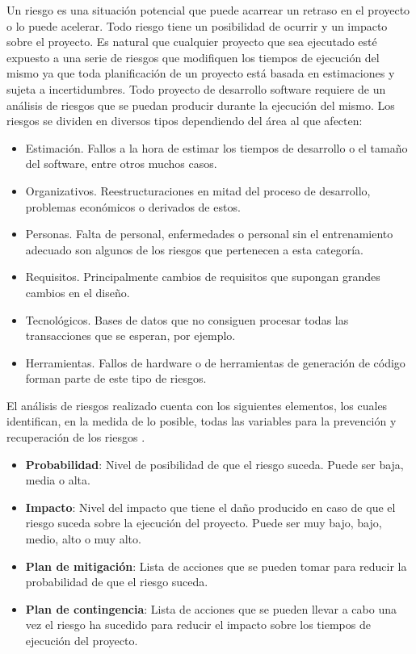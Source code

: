 Un riesgo es una situación potencial que puede acarrear un retraso en el proyecto o lo puede acelerar. Todo riesgo tiene un posibilidad de ocurrir y un impacto sobre el proyecto. Es natural que cualquier proyecto que sea ejecutado esté expuesto a una serie de riesgos que modifiquen los tiempos de ejecución del mismo ya que toda planificación de un proyecto está basada en estimaciones y sujeta a incertidumbres. Todo proyecto de desarrollo software requiere de un análisis de riesgos que se puedan producir durante la ejecución del mismo. Los riesgos se dividen en diversos tipos dependiendo del área al que afecten:

\begin{itemize}
	\item Estimación. Fallos a la hora de estimar los tiempos de desarrollo o el tamaño del software, entre otros muchos casos.
	\item Organizativos. Reestructuraciones en mitad del proceso de desarrollo, problemas económicos o derivados de estos.
	\item Personas. Falta de personal, enfermedades o personal sin el entrenamiento adecuado son algunos de los riesgos que pertenecen a esta categoría.
	\item Requisitos. Principalmente cambios de requisitos que supongan grandes cambios en el diseño.
	\item Tecnológicos. Bases de datos que no consiguen procesar todas las transacciones que se esperan, por ejemplo.
	\item Herramientas. Fallos de hardware o de herramientas de generación de código forman parte de este tipo de riesgos.
\end{itemize}

El análisis de riesgos realizado cuenta con los siguientes elementos, los cuales identifican, en la medida de lo posible, todas las variables para la prevención y recuperación de los riesgos \cite{hughes2009software} \cite{sommerville2016software}.

\begin{itemize}
	\item \textbf{Probabilidad}: Nivel de posibilidad de que el riesgo suceda. Puede ser baja, media o alta.
	\item \textbf{Impacto}: Nivel del impacto que tiene el daño producido en caso de que el riesgo suceda sobre la ejecución del proyecto. Puede ser muy bajo, bajo, medio, alto o muy alto.
	\item \textbf{Plan de mitigación}: Lista de acciones que se pueden tomar para reducir la probabilidad de que el riesgo suceda.
	\item \textbf{Plan de contingencia}: Lista de acciones que se pueden llevar a cabo una vez el riesgo ha sucedido para reducir el impacto sobre los tiempos de ejecución del proyecto.
\end{itemize}

